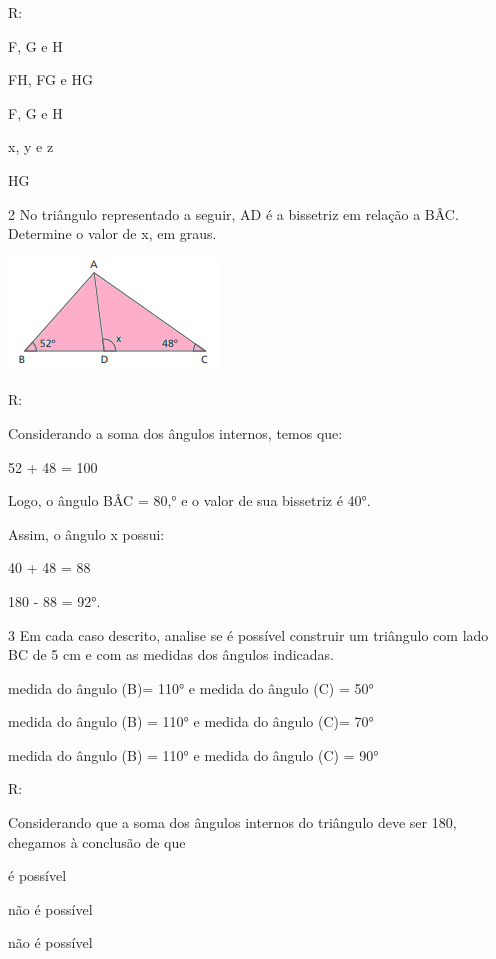 {R:
\item F, G e H
\item FH, FG e HG
\item F, G e H
\item x, y e z
\item HG

\num{2} No triângulo representado a seguir, AD é a bissetriz em relação a
BÂC. Determine o valor de x, em graus.

\includegraphics[width=2.20833in,height=1.1875in]{./imgSAEB_8_MAT/media/image14.png}

R:

Considerando a soma dos ângulos internos, temos que:

52 + 48 = 100

Logo, o ângulo BÂC = 80,° e o valor de sua bissetriz é 40°.

Assim, o ângulo x possui:

40 + 48 = 88

180 - 88 = 92°.

\num{3} Em cada caso descrito, analise se é possível construir um triângulo
com lado BC de 5 cm e com as medidas dos ângulos indicadas.
\item medida do ângulo (B)= 110° e medida do ângulo (C) = 50°
\item medida do ângulo (B) = 110° e medida do ângulo (C)= 70°
\item medida do ângulo (B) = 110° e medida do ângulo (C) = 90°

R:

Considerando que a soma dos ângulos internos do triângulo deve ser 180,
chegamos à conclusão de que
\item é possível
\item não é possível
\item não é possível

}

